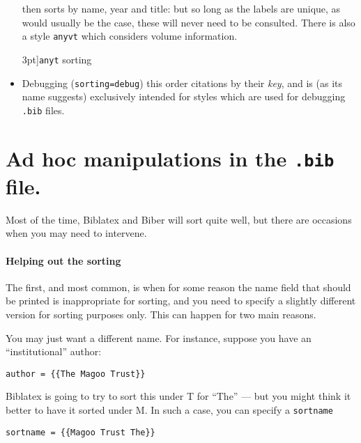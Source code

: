 \begin{itemize}
  then sorts by name, year and title: but so long as the labels are
  unique, as would usually be the case, these will never need to be
  consulted. There is also a style \texttt{anyvt} which
  considers volume information.
 \begin{marginfigure}[1ex]
\vspace{0.5pt}
  \caption[][3pt]{\texttt{anyt} sorting}
  \end{marginfigure}
\item
  Debugging (\texttt{sorting=debug}) this order citations by their
  \emph{key}, and is (as its name suggests) exclusively intended for
  styles which are used for debugging \texttt{.bib} files.
\end{itemize}

\section{Ad hoc manipulations in the \texttt{.bib} file.}

Most of the time, Biblatex and Biber will sort quite well, but there are
occasions when you may need to intervene.

\paragraph{Helping out the sorting}\label{sorting:sortname} The first,
and most common, is when for some reason the name field that should be
printed is inappropriate for sorting, and you need to specify a
slightly different version for sorting purposes only. This can happen
for two main reasons.

You may just want a different name. For instance, suppose you have an
``institutional'' author:
\begin{Verbatim}
author = {{The Magoo Trust}}
\end{Verbatim}
Biblatex is going to try to sort this under T for ``The'' --- but you
might think it better to have it sorted under M. In such a case, you
can specify a \texttt{sortname}
\begin{Verbatim}
sortname = {{Magoo Trust The}}
\end{Verbatim}

